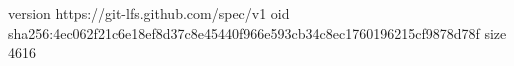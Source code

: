 version https://git-lfs.github.com/spec/v1
oid sha256:4ec062f21c6e18ef8d37c8e45440f966e593cb34c8ec1760196215cf9878d78f
size 4616
